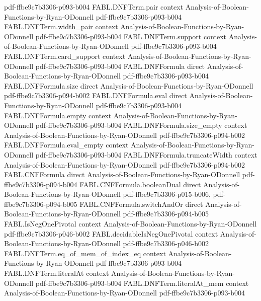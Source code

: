 \begin{theorem}
  {pdf-ffbe9c7b3306-p093-b004}
\proofstep
  {FABL.DNFTerm.pair}
  {context}
  {Analysis-of-Boolean-Functions-by-Ryan-ODonnell}
  {pdf-ffbe9c7b3306-p093-b004}
\proofstep
  {FABL.DNFTerm.width_pair}
  {context}
  {Analysis-of-Boolean-Functions-by-Ryan-ODonnell}
  {pdf-ffbe9c7b3306-p093-b004}
\proofstep
  {FABL.DNFTerm.support}
  {context}
  {Analysis-of-Boolean-Functions-by-Ryan-ODonnell}
  {pdf-ffbe9c7b3306-p093-b004}
\proofstep
  {FABL.DNFTerm.card_support}
  {context}
  {Analysis-of-Boolean-Functions-by-Ryan-ODonnell}
  {pdf-ffbe9c7b3306-p093-b004}
\proofstep
  {FABL.DNFFormula}
  {direct}
  {Analysis-of-Boolean-Functions-by-Ryan-ODonnell}
  {pdf-ffbe9c7b3306-p093-b004}
\proofstep
  {FABL.DNFFormula.size}
  {direct}
  {Analysis-of-Boolean-Functions-by-Ryan-ODonnell}
  {pdf-ffbe9c7b3306-p094-b002}
\proofstep
  {FABL.DNFFormula.eval}
  {direct}
  {Analysis-of-Boolean-Functions-by-Ryan-ODonnell}
  {pdf-ffbe9c7b3306-p093-b004}
\proofstep
  {FABL.DNFFormula.empty}
  {context}
  {Analysis-of-Boolean-Functions-by-Ryan-ODonnell}
  {pdf-ffbe9c7b3306-p093-b004}
\proofstep
  {FABL.DNFFormula.size_empty}
  {context}
  {Analysis-of-Boolean-Functions-by-Ryan-ODonnell}
  {pdf-ffbe9c7b3306-p094-b002}
\proofstep
  {FABL.DNFFormula.eval_empty}
  {context}
  {Analysis-of-Boolean-Functions-by-Ryan-ODonnell}
  {pdf-ffbe9c7b3306-p093-b004}
\proofstep
  {FABL.DNFFormula.truncateWidth}
  {context}
  {Analysis-of-Boolean-Functions-by-Ryan-ODonnell}
  {pdf-ffbe9c7b3306-p094-b002}
\proofstep
  {FABL.CNFFormula}
  {direct}
  {Analysis-of-Boolean-Functions-by-Ryan-ODonnell}
  {pdf-ffbe9c7b3306-p094-b004}
\proofstep
  {FABL.CNFFormula.booleanDual}
  {direct}
  {Analysis-of-Boolean-Functions-by-Ryan-ODonnell}
  {pdf-ffbe9c7b3306-p015-b006,
    pdf-ffbe9c7b3306-p094-b005}
\proofstep
  {FABL.CNFFormula.switchAndOr}
  {direct}
  {Analysis-of-Boolean-Functions-by-Ryan-ODonnell}
  {pdf-ffbe9c7b3306-p094-b005}
\proofstep
  {FABL.IsNegOnePivotal}
  {context}
  {Analysis-of-Boolean-Functions-by-Ryan-ODonnell}
  {pdf-ffbe9c7b3306-p046-b002}
\proofstep
  {FABL.decidableIsNegOnePivotal}
  {context}
  {Analysis-of-Boolean-Functions-by-Ryan-ODonnell}
  {pdf-ffbe9c7b3306-p046-b002}
\proofstep
  {FABL.DNFTerm.eq_of_mem_of_index_eq}
  {context}
  {Analysis-of-Boolean-Functions-by-Ryan-ODonnell}
  {pdf-ffbe9c7b3306-p093-b004}
\proofstep
  {FABL.DNFTerm.literalAt}
  {context}
  {Analysis-of-Boolean-Functions-by-Ryan-ODonnell}
  {pdf-ffbe9c7b3306-p093-b004}
\proofstep
  {FABL.DNFTerm.literalAt_mem}
  {context}
  {Analysis-of-Boolean-Functions-by-Ryan-ODonnell}
  {pdf-ffbe9c7b3306-p093-b004}
\proofstep

\end{theorem}
